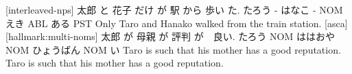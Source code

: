 [interleaved-nps]
太郎  と 花子  だけ が  駅  から 歩い  た.
たろう - はなこ -  NOM えき ABL ある  PST
Only Taro and Hanako walked from the train station.
[asca]
[hallmark:multi-noms]
太郎  が   母親    が   評判      が　良い.
たろう NOM ははおや NOM ひょうばん NOM い
Taro is such that his mother has a good reputation.
Taro is such that his mother has a good reputation.
